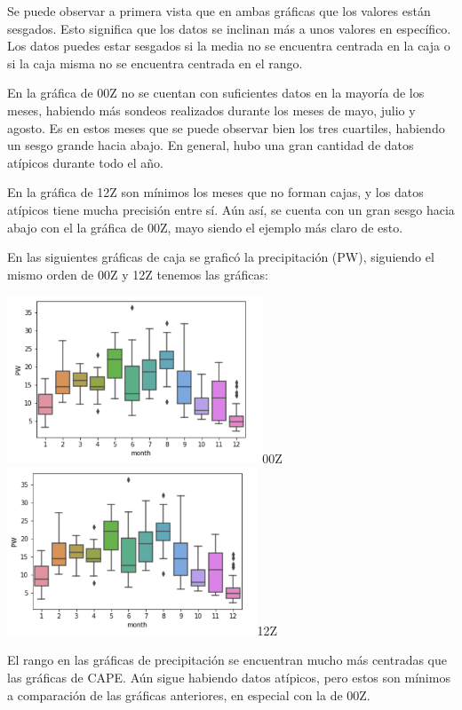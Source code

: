 \documentclass{article}
\begin{document}
Se puede observar a primera vista que en ambas gráficas que los valores están sesgados. Esto significa que los datos se inclinan más a unos valores en específico. Los datos puedes estar sesgados si la media no se encuentra centrada en la caja o si la caja misma no se encuentra centrada en el rango.

En la gráfica de 00Z no se cuentan con suficientes datos en la mayoría de los meses, habiendo más sondeos realizados durante los meses de mayo, julio y agosto. Es en estos meses que se puede observar bien los tres cuartiles, habiendo un sesgo grande hacia abajo. En general, hubo una gran cantidad de datos atípicos durante todo el año.

En la gráfica de 12Z son mínimos los meses que no forman cajas, y los datos atípicos tiene mucha precisión entre sí. Aún así, se cuenta con un gran sesgo hacia abajo con el la gráfica de 00Z, mayo siendo el ejemplo más claro de esto.

En las siguientes gráficas de caja se graficó la precipitación (PW), siguiendo el mismo orden de 00Z y 12Z tenemos las gráficas:

	\begin{center}
    \includegraphics[height=5cm]{cajaPW00.png}{00Z}
    \includegraphics[height=5cm]{cajaPW12.png}{12Z}
    \end{center}

El rango en las gráficas de precipitación se encuentran mucho más centradas que las gráficas de CAPE. Aún sigue habiendo datos atípicos, pero estos son mínimos a comparación de las gráficas anteriores, en especial con la de 00Z.
\end{document}
